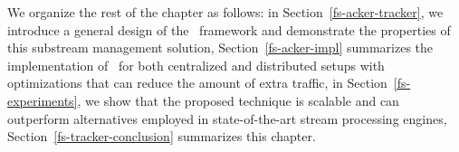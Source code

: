 
We organize the rest of the chapter as follows: in Section~\ref{fs-acker-tracker}, we introduce a general design of the \tracker\ framework and demonstrate the properties of this substream management solution, Section~\ref{fs-acker-impl} summarizes the implementation of \tracker\ for both centralized and distributed setups with optimizations that can reduce the amount of extra traffic, in Section~\ref{fs-experiments}, we show that the proposed technique is scalable and can outperform alternatives employed in state-of-the-art stream processing engines, Section~\ref{fs-tracker-conclusion} summarizes this chapter.